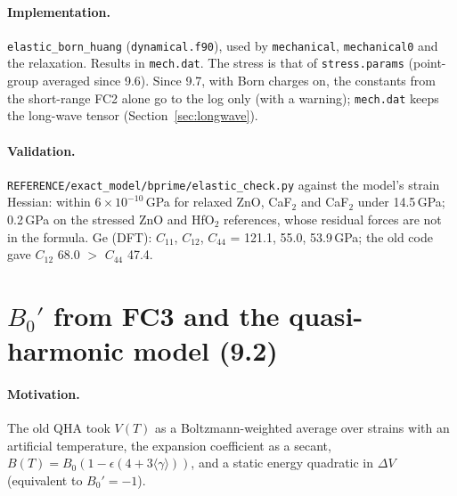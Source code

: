 \documentclass[11pt,a4paper]{article}
\newcommand{\code}[1]{\texttt{#1}}
\begin{document}
\paragraph{Implementation.} \code{elastic\_born\_huang} (\code{dynamical.f90}), used by \code{mechanical},
\code{mechanical0} and the relaxation. Results in \code{mech.dat}. The stress is that of
\code{stress.params} (point-group averaged since 9.6). Since 9.7, with Born charges on, the constants from
the short-range FC2 alone go to the log only (with a warning); \code{mech.dat} keeps the long-wave tensor
(Section~\ref{sec:longwave}).

\paragraph{Validation.} \code{REFERENCE/exact\_model/bprime/elastic\_check.py} against the model's strain
Hessian: within $6\times10^{-10}$\,GPa for relaxed ZnO, CaF$_2$ and CaF$_2$ under 14.5\,GPa; 0.2\,GPa on the
stressed ZnO and HfO$_2$ references, whose residual forces are not in the formula. Ge (DFT): $C_{11}$,
$C_{12}$, $C_{44}$ = 121.1, 55.0, 53.9\,GPa; the old code gave $C_{12}$ 68.0 $>$ $C_{44}$ 47.4.

\section{\texorpdfstring{$B_0'$ from FC3 and the quasi-harmonic model (9.2)}{B0' from FC3 and the quasi-harmonic model (9.2)}}\label{sec:qha}
\paragraph{Motivation.} The old QHA took $V(T)$ as a Boltzmann-weighted average over strains with an
artificial temperature, the expansion coefficient as a secant, $B(T)=B_0(1-\epsilon(4+3\langle\gamma\rangle))$,
and a static energy quadratic in $\Delta V$ (equivalent to $B_0'=-1$).
\end{document}
